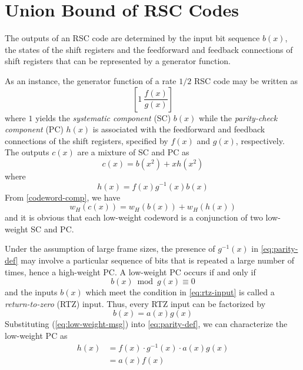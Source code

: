 \section{Union Bound of RSC Codes}
\label{sec2}
The outputs of an RSC code are determined by the input bit sequence $b(x)$, the states of the shift registers and the feedforward and feedback connections of shift registers that can be represented by a generator function. 

As an instance,  the generator function of a rate $1/2$ RSC code may be written as  $$\left[1 ~\frac{f(x)}{g(x)}\right]$$ where $1$ yields the \textit{systematic  component} (SC) $b(x)$ while the \textit{parity-check component} (PC) $h(x)$ is associated with the feedforward and feedback connections of the shift registers, specified by  $f(x)$ and $g(x)$, respectively. The outputs $c(x)$ are a mixture of SC and PC as
\begin{equation}
c(x) = b(x^2)+xh(x^2)
\label{codeword-comp}
\end{equation}
where 
\begin{equation}
h(x) =f(x)g^{-1}(x)b(x)
\label{eq:parity-def}
\end{equation}
From \eqref{codeword-comp}, we have
\begin{equation}
w_H(c(x))=w_H(b(x)) + w_H(h(x))
\label{eq:cw-weight}
\end{equation}
 and it is obvious that each low-weight codeword is a conjunction of two low-weight SC and PC.

Under the assumption of large frame sizes, the presence of $g^{-1}(x)$  in \eqref{eq:parity-def} may involve a particular sequence of bits that is repeated a large number of times, hence a high-weight PC. A low-weight PC occurs if and only if
\begin{equation}
b(x) \bmod g(x) \equiv 0
\label{eq:rtz-input}
\end{equation}
and the inputs $b(x)$ which meet the condition in \eqref{eq:rtz-input} is called a \textit{return-to-zero} (RTZ) input. Thus, every RTZ input can be factorized by  
\begin{equation}
b(x) =a(x)g(x)
\label{eq:low-weight-msg}
\end{equation}
Substituting (\ref{eq:low-weight-msg}) into \eqref{eq:parity-def}, we can characterize the low-weight PC as
\begin{equation}
\begin{split}
h(x)&=f(x)\cdot g^{-1}(x)\cdot a(x)g(x)\\
&=a(x)f(x)
\end{split}
\label{eq:low-weight-parity}
\end{equation}

